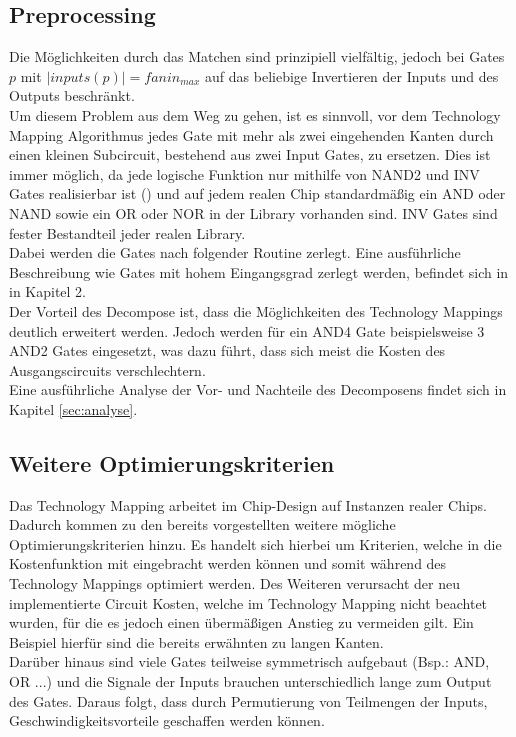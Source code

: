 \documentclass[11pt, a4paper, german]{article}
\newcommand{\TM}{Technology  Mapping }
\begin{document}
\subsection{Preprocessing}
Die Möglichkeiten durch das Matchen sind prinzipiell vielfältig, jedoch bei Gates $p$ mit $|inputs(p)| = fanin_{max}$ auf das beliebige Invertieren der Inputs und des Outputs beschränkt. \\
Um diesem Problem aus dem Weg zu gehen, ist es sinnvoll, vor dem \TM Algorithmus jedes Gate mit mehr als zwei eingehenden Kanten durch einen kleinen Subcircuit, bestehend aus zwei Input Gates, zu ersetzen. Dies ist immer möglich, da jede logische Funktion nur mithilfe von NAND2 und INV Gates realisierbar ist (\cite{Post}) und auf jedem realen Chip standardmäßig ein AND oder NAND sowie ein OR oder NOR in der Library vorhanden sind. INV Gates sind fester Bestandteil jeder realen Library.\\
Dabei werden die Gates nach folgender Routine zerlegt. Eine ausführliche Beschreibung wie Gates mit hohem Eingangsgrad zerlegt werden, befindet sich in \cite{WerberDiss} in Kapitel 2. \\
Der Vorteil des Decompose ist, dass die Möglichkeiten des Technology Mappings deutlich erweitert werden. Jedoch werden für ein AND4 Gate beispielsweise 3 AND2 Gates eingesetzt, was dazu führt, dass sich meist die Kosten des Ausgangscircuits verschlechtern.\\
Eine ausführliche Analyse der Vor- und Nachteile des Decomposens findet sich in Kapitel \ref{sec:analyse}.

\subsection{Weitere Optimierungskriterien}
\label{sec:weitere_opt_krit}
Das \TM arbeitet im Chip-Design auf Instanzen realer Chips. Dadurch kommen zu den bereits vorgestellten weitere mögliche Optimierungskriterien hinzu. Es handelt sich hierbei um Kriterien, welche in die Kostenfunktion mit eingebracht werden können und somit während des Technology Mappings optimiert werden. Des Weiteren verursacht der neu implementierte Circuit Kosten, welche im \TM nicht beachtet wurden, für die es jedoch einen übermäßigen Anstieg zu vermeiden gilt. Ein Beispiel hierfür sind die bereits erwähnten zu langen Kanten.\\
Darüber hinaus sind viele Gates teilweise symmetrisch aufgebaut (Bsp.: AND, OR ...) und die Signale der Inputs brauchen unterschiedlich lange zum Output des Gates. Daraus folgt, dass durch Permutierung von Teilmengen der Inputs, Geschwindigkeitsvorteile geschaffen werden können.  
\end{document}
